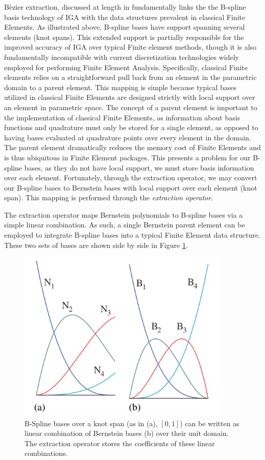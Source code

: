 \documentclass[./]{subfiles}
\begin{document}
B\`{e}zier extraction, discussed at length in \cite{borden_isogeometric_2011} fundamentally links the the B-spline basis technology of IGA with the data structures prevalent in classical Finite Elements. As illustrated above, B-spline bases have support spanning several elements (knot spans). This extended support is partially responsible for the improved accuracy of IGA over typical Finite element methods, though it is also fundamentally incompatible with current discretization technologies widely employed for performing Finite Element Analysis. Specifically, classical Finite elements relies on a straightforward pull back from an element in the parametric domain to a parent element. This mapping is simple because typical bases utilized in classical Finite Elements are designed strictly with local support over an element in parametric space. The concept of a parent element is important to the implementation of classical Finite Elements, as information about basis functions and quadrature must only be stored for a single element, as opposed to having bases evaluated at quadrature points over every element in the domain. The parent element dramatically reduces the memory cost of Finite Elements and is thus ubiquitous in Finite Element packages. This presents a problem for our B-spline bases, as they do not have local support, we must store basis information over each element. Fortunately, through the extraction operator, we may convert our B-spline bases to Bernstein bases with local support over each element (knot span). This mapping is performed through the \textit{extraction operator}. 

The extraction operator maps Bernstein polynomials to B-spline bases via a simple linear combination.  As such, a single Bernstein parent element can be employed to integrate B-spline bases into a typical Finite Element data structure. These two sets of bases are shown side by side in Figure \ref{fig:extracted}. 

\begin{figure}
  \centerline{\includegraphics[width=4in]{./figures/Extracted_B-Spline}}
  \caption{\cite{borden_isogeometric_2011} B-Spline bases over a knot span (as in (a), $[0,1]$) can be written as linear combination of Bernstein bases (b) over their unit domain. The extraction operator stores the coefficients of these linear combinations.}
  \label{fig:extracted}
\end{figure}
\end{document}
